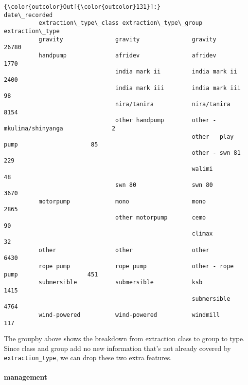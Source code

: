 \documentclass[11pt]{article}
\begin{document}
\begin{Verbatim}[commandchars=\\\{\}]
{\color{outcolor}Out[{\color{outcolor}131}]:}                                                                        date\_recorded
          extraction\_type\_class extraction\_type\_group extraction\_type                         
          gravity               gravity               gravity                            26780
          handpump              afridev               afridev                             1770
                                india mark ii         india mark ii                       2400
                                india mark iii        india mark iii                        98
                                nira/tanira           nira/tanira                         8154
                                other handpump        other - mkulima/shinyanga              2
                                                      other - play pump                     85
                                                      other - swn 81                       229
                                                      walimi                                48
                                swn 80                swn 80                              3670
          motorpump             mono                  mono                                2865
                                other motorpump       cemo                                  90
                                                      climax                                32
          other                 other                 other                               6430
          rope pump             rope pump             other - rope pump                    451
          submersible           submersible           ksb                                 1415
                                                      submersible                         4764
          wind-powered          wind-powered          windmill                             117
\end{Verbatim}
            
    The groupby above shows the breakdown from extraction class to group to
type. Since class and group add no new information that's not already
covered by \texttt{extraction\_type}, we can drop these two extra
features.

    \paragraph{management}\label{management}
\end{document}
